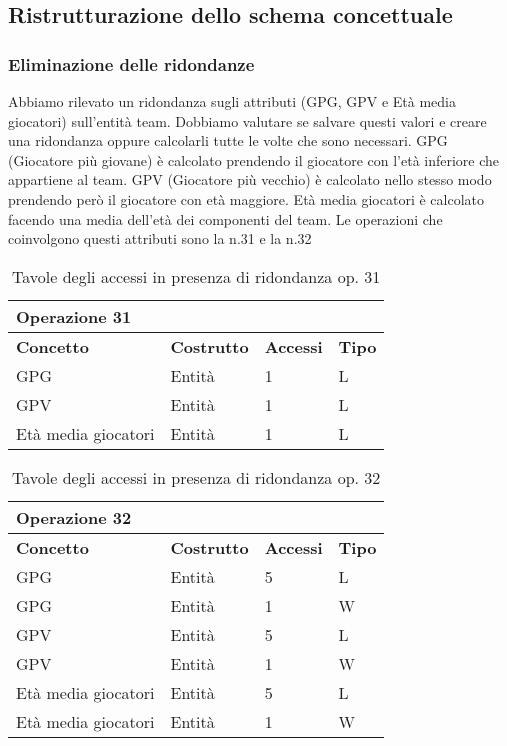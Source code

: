 \documentclass{article}
\begin{document}
\subsection{Ristrutturazione dello schema concettuale}

\subsubsection{Eliminazione delle ridondanze}
Abbiamo rilevato un ridondanza sugli attributi (GPG, GPV e Età media giocatori) sull'entità team. Dobbiamo valutare se salvare questi valori e creare una ridondanza oppure calcolarli tutte le volte che sono necessari. GPG (Giocatore più giovane) è calcolato prendendo il giocatore con l'età inferiore che appartiene al team. GPV (Giocatore più vecchio) è calcolato nello stesso modo prendendo però il giocatore con età maggiore. Età media giocatori è calcolato facendo una media dell'età dei componenti del team. Le operazioni che coinvolgono questi attributi sono la n.31 e la n.32 \\

\begin{table}
    \centering
    \begin{tabularx}{\textwidth}{|X|X|X|X|}
        \hline 
        \textbf{Operazione 31} & & & \\ \hline
        \textbf{Concetto} & \textbf{Costrutto} & \textbf{Accessi} & \textbf{Tipo} \\ \hline
        GPG & Entità & 1 & L \\ \hline
        GPV & Entità & 1 & L \\ \hline
        Età media giocatori & Entità & 1 & L \\ \hline
    \end{tabularx}
    \caption{Tavole degli accessi in presenza di ridondanza op. 31}
\end{table}


\begin{table}
    \centering
    \begin{tabularx}{\textwidth}{|X|X|X|X|}
        \hline
        \textbf{Operazione 32} & & & \\ \hline
        \textbf{Concetto} & \textbf{Costrutto} & \textbf{Accessi} & \textbf{Tipo} \\ \hline
        GPG & Entità & 5 & L \\ \hline
        GPG & Entità & 1 & W \\ \hline
        GPV & Entità & 5 & L \\ \hline
        GPV & Entità & 1 & W \\ \hline
        Età media giocatori & Entità & 5 & L \\ \hline
        Età media giocatori & Entità & 1 & W \\ \hline
    \end{tabularx}
    \caption{Tavole degli accessi in presenza di ridondanza op. 32}
\end{table}
\end{document}
